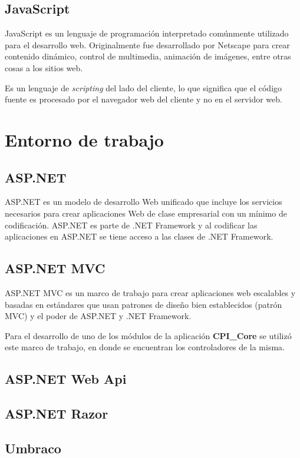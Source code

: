 \subsection{JavaScript}
JavaScript es un lenguaje de programación  interpretado comúnmente utilizado para el desarrollo web. Originalmente fue desarrollado por Netscape para crear contenido dinámico, control de multimedia, animación de imágenes, entre otras cosas a los sitios web.

Es un lenguaje de \textit{scripting} del lado del cliente, lo que significa que el código fuente es procesado por el navegador web del cliente y no en el servidor web. \cite{javaScriptChristensson}


\section{Entorno de trabajo}
\subsection{ASP.NET}
ASP.NET es un modelo de desarrollo Web unificado que incluye los servicios necesarios para crear aplicaciones Web de clase empresarial con un mínimo de codificación. ASP.NET es parte de .NET Framework y al codificar las aplicaciones en ASP.NET se tiene acceso a las clases de .NET Framework. \cite{aspMicrosoft}

\subsection{ASP.NET MVC}
ASP.NET MVC es un marco de trabajo para crear aplicaciones web escalables y basadas en estándares que usan patrones de diseño bien establecidos (patrón MVC) y el poder de ASP.NET y .NET Framework. \cite{aspmvcMicrosoft}

Para el desarrollo de uno de los módulos de la aplicación \textbf{CPI\_Core} se utilizó este marco de trabajo, en donde se encuentran los controladores de la misma.

\subsection{ASP.NET Web Api}
\subsection{ASP.NET Razor}
\subsection{Umbraco}

